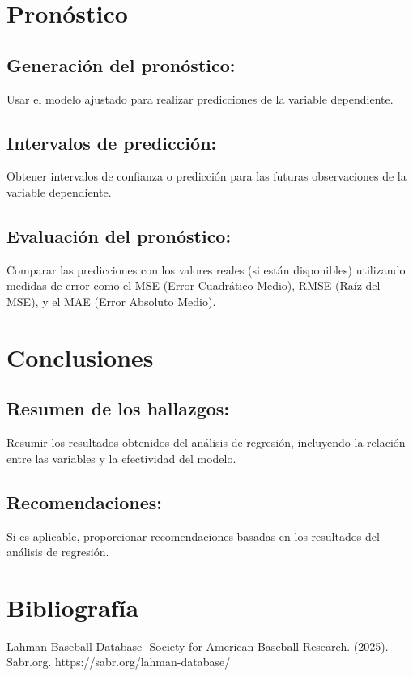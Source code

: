 \documentclass[10pt]{article}
\begin{document}
\section{Pronóstico}
\subsection{Generación del pronóstico:}
Usar el modelo ajustado para realizar predicciones de la variable dependiente.

\subsection{Intervalos de predicción:}
Obtener intervalos de confianza o predicción para las futuras observaciones de la variable dependiente.

\subsection{Evaluación del pronóstico:}
Comparar las predicciones con los valores reales (si están disponibles) utilizando medidas de error como el MSE (Error Cuadrático Medio), RMSE (Raíz del MSE), y el MAE (Error Absoluto Medio).
\section{Conclusiones}
\subsection{Resumen de los hallazgos:}
Resumir los resultados obtenidos del análisis de regresión, incluyendo la relación entre las variables y la efectividad del modelo.

\subsection{Recomendaciones:}
Si es aplicable, proporcionar recomendaciones basadas en los resultados del análisis de regresión.
\section{Bibliografía}
Lahman Baseball Database -Society for American Baseball Research. (2025). Sabr.org. https://sabr.org/lahman-database/
\end{document}
